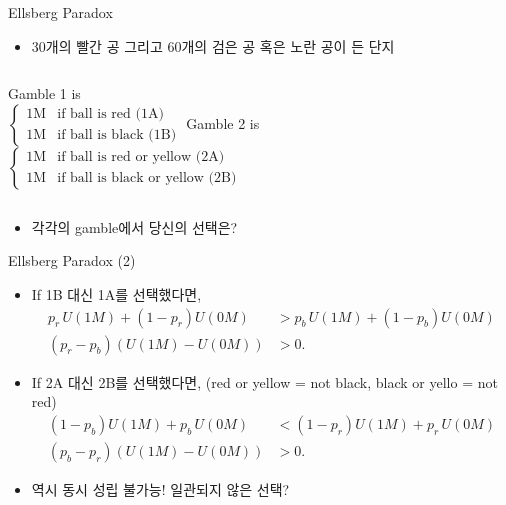 \documentclass[final]{beamer}
\begin{document}
\begin{frame}[t]{Ellsberg Paradox}
	\begin{itemize}
	\item 30개의 빨간 공 그리고 60개의 검은 공 혹은 노란 공이 든 단지
	\end{itemize}
	\vspace{1em}
	\begin{columns}[c]
	\column{11em}
	Gamble 1 is \\[1em]
	$
	\begin{cases}
	\text{1M}& \text{if ball is red (1A)} \\
	\text{1M}& \text{if ball is black (1B)}
	\end{cases}
	$
	\column{15em}
	Gamble 2 is \\[1em]
	$
	\begin{cases}
	\text{1M}& \text{if ball is red or yellow (2A)} \\
	\text{1M}& \text{if ball is black or yellow (2B)}
	\end{cases}
	$
	\end{columns}
	\vspace{1.5em}
	\begin{itemize}
	\item 각각의 gamble에서 당신의 선택은? 
	\end{itemize}
\end{frame}

\begin{frame}[t]{Ellsberg Paradox (2)}
	\begin{itemize}
		\item If 1B 대신 1A를 선택했다면,
	\begin{align*}
	p_r{\,}U(1M) + (1-p_r) U(0M) & > p_b{\,}U(1M) + (1-p_b) U(0M)\\
	(p_r-p_b) \left( U(1M)-U(0M) \right) &>0.
	\end{align*}
		\item If 2A 대신 2B를 선택했다면, (red or yellow = not black, black or yello = not red)
	\begin{align*}
	(1-p_b)U(1M) + p_b{\,}U(0M)  & < (1-p_r)U(1M) + p_r{\,}U(0M)\\
	(p_b-p_r) \left( U(1M)-U(0M) \right) & >0.
	\end{align*}
	\item 역시 동시 성립 불가능! 일관되지 않은 선택?
	\end{itemize}
\end{frame}
\end{document}
